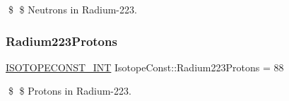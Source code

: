 \$ \$ Neutrons in Radium-\/223. \mbox{\label{group___isotope_const-_radium-_ra223_gae548f320676f0dffeeef732a66de4608}} 
\subsubsection{\texorpdfstring{Radium223\+Protons}{Radium223Protons}}
{\footnotesize\ttfamily \mbox{\hyperlink{group___isotope_const-_macros_ga5f18360b3e99483a35c32d789e62621c}{I\+S\+O\+T\+O\+P\+E\+C\+O\+N\+S\+T\+\_\+\+I\+NT}} Isotope\+Const\+::\+Radium223\+Protons = 88}

\$ \$ Protons in Radium-\/223. 